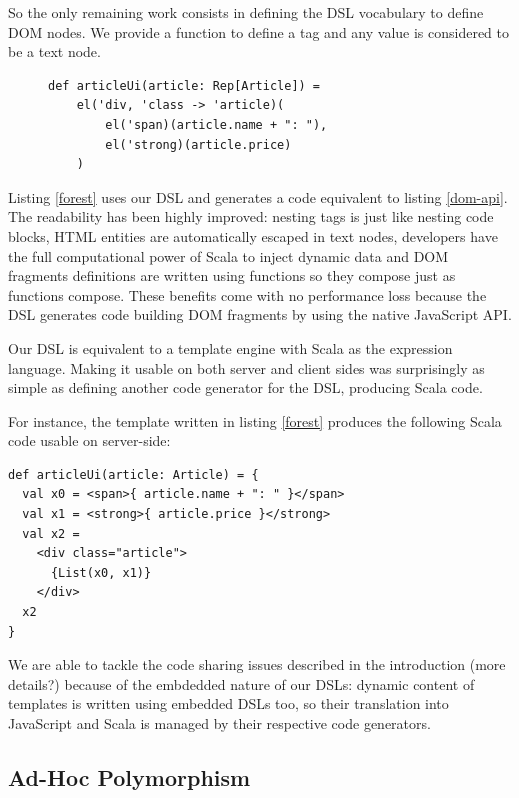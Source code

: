 \documentclass[preprint]{sigplanconf}
\begin{document}
So the only remaining work consists in defining the DSL vocabulary to define DOM nodes. We provide a 
function to define a tag and any  value is considered to be a text node.

\begin{figure}
\begin{lstlisting}[label=forest,caption=DOM definition DSL]
def articleUi(article: Rep[Article]) =
    el('div, 'class -> 'article)(
        el('span)(article.name + ": "),
        el('strong)(article.price)
    )
\end{lstlisting}
\end{figure}

Listing \ref{forest} uses our DSL and generates a code equivalent to listing \ref{dom-api}. The readability has
been highly improved: nesting tags is just like nesting code blocks, HTML entities are
automatically escaped in text nodes, developers have the full computational power of Scala to inject dynamic data and
DOM fragments definitions are written using functions so they compose just as functions compose. These benefits come
with no performance loss because the DSL generates code building DOM fragments by using the native JavaScript API.

Our DSL is equivalent to a template engine with Scala as the expression language. Making it usable on both server and
client sides was surprisingly as simple as defining another code generator for the DSL, producing Scala code.

For instance, the template written in listing \ref{forest} produces the following Scala code usable on
server-side:

\begin{lstlisting}
def articleUi(article: Article) = {
  val x0 = <span>{ article.name + ": " }</span>
  val x1 = <strong>{ article.price }</strong>
  val x2 =
    <div class="article">
      {List(x0, x1)}
    </div>
  x2
}
\end{lstlisting}

We are able to tackle the code sharing issues described in the introduction (more details?) because of the embdedded
nature of our DSLs: dynamic content of templates is written using embedded DSLs too, so their translation into
JavaScript and Scala is managed by their respective code generators.

\subsection{Ad-Hoc Polymorphism}
\end{document}
